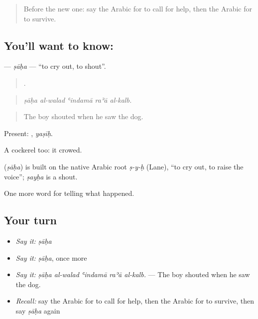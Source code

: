 \label{lesson:AR-C310-saha}



\begin{quote}
Before the new one: say the Arabic for to call for help, then the Arabic for to survive.
\end{quote}

\subsection*{You'll want to know: }
\textbf{} — \emph{ṣāḥa} — \textquotedblleft{}to cry out, to shout\textquotedblright{}.

\begin{quote}
    .
\end{quote}

\begin{quote}
\emph{ṣāḥa al-walad ʿindamā raʾā al-kalb.}
\end{quote}

\begin{quote}
The boy shouted when he saw the dog.
\end{quote}

Present: , \emph{yaṣīḥ}.

A cockerel  too: it crowed.

\begin{cousinweb}
\textbf{} (\emph{ṣāḥa}) is built on the native Arabic root \emph{ṣ-y-ḥ} (Lane), \textquotedblleft{}to cry out, to raise the voice\textquotedblright{}; \emph{ṣayḥa} is a shout.
\end{cousinweb}

\begin{grammarlens}[title={What you've built}]
One more word for telling what happened.
\end{grammarlens}

\subsection*{Your turn}
\begin{itemize}
\raggedright
  \item \emph{Say it:} \emph{ṣāḥa}
  \item \emph{Say it:} \emph{ṣāḥa}, once more
  \item \emph{Say it:} \emph{ṣāḥa al-walad ʿindamā raʾā al-kalb.} — The boy shouted when he saw the dog.
  \item \emph{Recall:} say the Arabic for to call for help, then the Arabic for to survive, then say \emph{ṣāḥa} again
\end{itemize}

